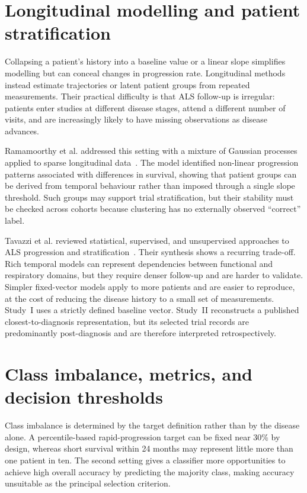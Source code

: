 \section{Longitudinal modelling and patient stratification}

Collapsing a patient's history into a baseline value or a linear slope simplifies modelling but can conceal changes in progression rate. Longitudinal methods instead estimate trajectories or latent patient groups from repeated measurements. Their practical difficulty is that ALS follow-up is irregular: patients enter studies at different disease stages, attend a different number of visits, and are increasingly likely to have missing observations as disease advances.

Ramamoorthy et al. addressed this setting with a mixture of Gaussian processes applied to sparse longitudinal data~\cite{Ramamoorthy2022}. The model identified non-linear progression patterns associated with differences in survival, showing that patient groups can be derived from temporal behaviour rather than imposed through a single slope threshold. Such groups may support trial stratification, but their stability must be checked across cohorts because clustering has no externally observed ``correct'' label.

Tavazzi et al. reviewed statistical, supervised, and unsupervised approaches to ALS progression and stratification~\cite{Tavazzi2023}. Their synthesis shows a recurring trade-off. Rich temporal models can represent dependencies between functional and respiratory domains, but they require denser follow-up and are harder to validate. Simpler fixed-vector models apply to more patients and are easier to reproduce, at the cost of reducing the disease history to a small set of measurements. Study~I uses a strictly defined baseline vector. Study~II reconstructs a published closest-to-diagnosis representation, but its selected trial records are predominantly post-diagnosis and are therefore interpreted retrospectively.

\section{Class imbalance, metrics, and decision thresholds}
\label{sec:soa_imbalance}

Class imbalance is determined by the target definition rather than by the disease alone. A percentile-based rapid-progression target can be fixed near 30\% by design, whereas short survival within 24 months may represent little more than one patient in ten. The second setting gives a classifier more opportunities to achieve high overall accuracy by predicting the majority class, making accuracy unsuitable as the principal selection criterion.

